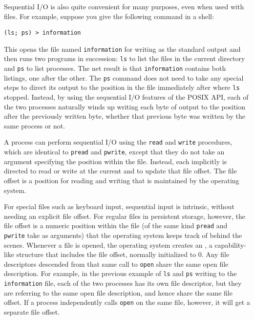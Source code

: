 Sequential I/O is also quite convenient for many purposes, even when
used with files.  For example, suppose you give the following command
in a shell:
\begin{verbatim}
(ls; ps) > information
\end{verbatim}
This opens the file named \verb|information| for writing as the
standard output and then runs two programs in succession: \verb|ls|
to list the files in the current directory and \verb|ps| to list
processes.  The net result is that \verb|information| contains both
listings, one after the other.  The \verb|ps| command does not need to
take any special steps to direct its output to the position in the
file immediately after where \verb|ls| stopped.  Instead, by using the
sequential I/O features of the POSIX API, each of the two processes
naturally winds up writing each byte of output to the position after
the previously written byte, whether that previous byte was written by
the same process or not.

A process can perform sequential I/O using the \verb|read| and
\verb|write| procedures, which are identical to \verb|pread| and
\verb|pwrite|, except that they do not take an argument specifying the
position within the file.  Instead, each implicitly is directed to
read or write at the current  and to
update that file offset.
The file offset is a position for reading and writing that is maintained by the
operating system.

For special files such as keyboard input, sequential input is
intrinsic, without needing an explicit file offset.  For regular
files in persistent storage, however, the file offset is a numeric
position within the file (of the same kind \verb|pread| and
\verb|pwrite| take as arguments) that the operating
system keeps track of behind the scenes.  Whenever a file is opened, the operating
system creates an
, a capability-like structure that includes the file
offset, normally initialized to 0.  Any file descriptors descended
from that same call to \verb|open| share the same open file
description.  For example, in the previous example of
\verb|ls| and \verb|ps| writing to the \verb|information| file, each
of the two processes has its own file descriptor, but they are
referring to the same open file description, and hence share the same
file offset.  If a process independently calls \verb|open| on the same
file, however, it will get a separate file offset.

